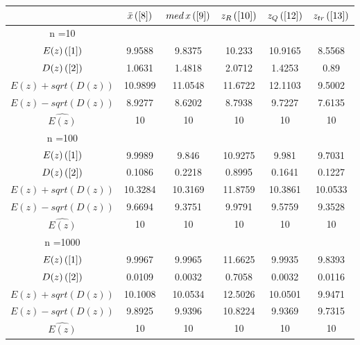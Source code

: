 \begin{tabular}{|c|c|c|c|c|c|}
\hline
 & $\bar{x} \, (\ref{8})$ & $med \, x \, (\ref{9})$ & $z_R \, (\ref{10})$ & $z_Q \, (\ref{12})$ & $z_{tr} \, (\ref{13})$ \\
\hline
n =10 &  &  &  &  & \\
\hline
$E(z) \, (\ref{1})$ & 9.9588 & 9.8375 & 10.233 & 10.9165 & 8.5568\\
\hline
$D(z) \, (\ref{2})$ & 1.0631 & 1.4818 & 2.0712 & 1.4253 & 0.89\\
\hline
$E(z)+sqrt(D(z))$ & 10.9899 & 11.0548 & 11.6722 & 12.1103 & 9.5002\\
\hline
$E(z)-sqrt(D(z))$ & 8.9277 & 8.6202 & 8.7938 & 9.7227 & 7.6135\\
\hline
$\hat{E(z)}$ & 10 & 10 & 10 & 10 & 10\\
\hline
n =100 &  &  &  &  & \\
\hline
$E(z) \, (\ref{1})$ & 9.9989 & 9.846 & 10.9275 & 9.981 & 9.7031\\
\hline
$D(z) \, (\ref{2})$ & 0.1086 & 0.2218 & 0.8995 & 0.1641 & 0.1227\\
\hline
$E(z)+sqrt(D(z))$ & 10.3284 & 10.3169 & 11.8759 & 10.3861 & 10.0533\\
\hline
$E(z)-sqrt(D(z))$ & 9.6694 & 9.3751 & 9.9791 & 9.5759 & 9.3528\\
\hline
$\hat{E(z)}$ & 10 & 10 & 10 & 10 & 10\\
\hline
n =1000 &  &  &  &  & \\
\hline
$E(z) \, (\ref{1})$ & 9.9967 & 9.9965 & 11.6625 & 9.9935 & 9.8393\\
\hline
$D(z) \, (\ref{2})$ & 0.0109 & 0.0032 & 0.7058 & 0.0032 & 0.0116\\
\hline
$E(z)+sqrt(D(z))$ & 10.1008 & 10.0534 & 12.5026 & 10.0501 & 9.9471\\
\hline
$E(z)-sqrt(D(z))$ & 9.8925 & 9.9396 & 10.8224 & 9.9369 & 9.7315\\
\hline
$\hat{E(z)}$ & 10 & 10 & 10 & 10 & 10\\
\hline
\end{tabular}